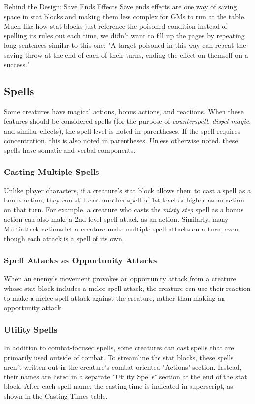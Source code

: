 \documentclass[10pt,a4paper,twoside,bg=print,twocolumn,openany,nodeprecatedcode]{dndbook}
\begin{document}
\begin{DndSidebar}[float=!b]{Behind the Design: Save Ends Effects}
Save ends effects are one way of saving space in stat blocks and making them less complex for GMs to run at the table. Much like how stat blocks just reference the poisoned condition instead of spelling its rules out each time, we didn't want to fill up the pages by repeating long sentences similar to this one: "A target poisoned in this way can repeat the saving throw at the end of each of their turns, ending the effect on themself on a success."



\end{DndSidebar}

\subsection{Spells}
Some creatures have magical actions, bonus actions, and reactions. When these features should be considered spells (for the purpose of \textit{counterspell}, \textit{dispel magic}, and similar effects), the spell level is noted in parentheses. If the spell requires concentration, this is also noted in parentheses. Unless otherwise noted, these spells have somatic and verbal components.

\subsubsection{Casting Multiple Spells}
Unlike player characters, if a creature's stat block allows them to cast a spell as a bonus action, they can still cast another spell of 1st level or higher as an action on that turn. For example, a creature who casts the \textit{misty step} spell as a bonus action can also make a 2nd-level spell attack as an action. Similarly, many Multiattack actions let a creature make multiple spell attacks on a turn, even though each attack is a spell of its own.

\subsubsection{Spell Attacks as Opportunity Attacks}
When an enemy's movement provokes an opportunity attack from a creature whose stat block includes a melee spell attack, the creature can use their reaction to make a melee spell attack against the creature, rather than making an opportunity attack.

\subsubsection{Utility Spells}
In addition to combat-focused spells, some creatures can cast spells that are primarily used outside of combat. To streamline the stat blocks, these spells aren't written out in the creature's combat-oriented "Actions" section. Instead, their names are listed in a separate "Utility Spells" section at the end of the stat block. After each spell name, the casting time is indicated in superscript, as shown in the Casting Times table.
\end{document}
